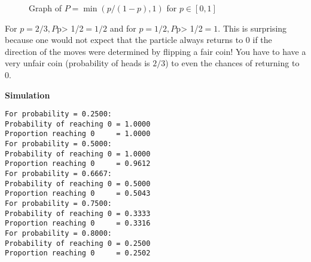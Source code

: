 \begin{figure}[tb]
\begin{center}
\end{center}
\caption{Graph of $P=\min(p/(1-p),1)$ for $p\in [0,1]$}\label{f.ruin2}
\end{figure}
For $p=2/3, P$p> 1/2$=1/2$ and for $p=1/2, P$p> 1/2$=1$. This is surprising because one would not expect that the particle always returns to $0$ if the direction of the moves were determined by flipping a fair coin! You have to have a very unfair coin (probability of heads is $2/3$) to even the chances of returning to $0$.

\textbf{Simulation}
\begin{verbatim}
For probability = 0.2500:
Probability of reaching 0 = 1.0000
Proportion reaching 0     = 1.0000
For probability = 0.5000:
Probability of reaching 0 = 1.0000
Proportion reaching 0     = 0.9612
For probability = 0.6667:
Probability of reaching 0 = 0.5000
Proportion reaching 0     = 0.5043
For probability = 0.7500:
Probability of reaching 0 = 0.3333
Proportion reaching 0     = 0.3316
For probability = 0.8000:
Probability of reaching 0 = 0.2500
Proportion reaching 0     = 0.2502
\end{verbatim}


